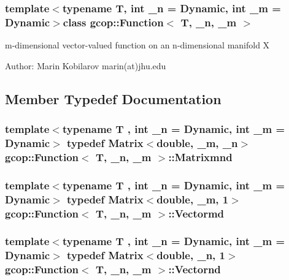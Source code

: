 \subsubsection*{template$<$typename T, int \-\_\-n = \-Dynamic, int \-\_\-m = \-Dynamic$>$class gcop\-::\-Function$<$ T, \-\_\-n, \-\_\-m $>$}

m-\/dimensional vector-\/valued function on an n-\/dimensional manifold \-X

\-Author\-: \-Marin \-Kobilarov marin(at)jhu.\-edu 

\subsection{\-Member \-Typedef \-Documentation}
\subsubsection[{\-Matrixmnd}]{\setlength{\rightskip}{0pt plus 5cm}template$<$typename T , int \-\_\-n = \-Dynamic, int \-\_\-m = \-Dynamic$>$ typedef \-Matrix$<$double, \-\_\-m, \-\_\-n$>$ {\bf gcop\-::\-Function}$<$ \-T, \-\_\-n, \-\_\-m $>$\-::{\bf \-Matrixmnd}}\label{classgcop_1_1Function_ae2d725545d47c845b3a5029243d09256}
\subsubsection[{\-Vectormd}]{\setlength{\rightskip}{0pt plus 5cm}template$<$typename T , int \-\_\-n = \-Dynamic, int \-\_\-m = \-Dynamic$>$ typedef \-Matrix$<$double, \-\_\-m, 1$>$ {\bf gcop\-::\-Function}$<$ \-T, \-\_\-n, \-\_\-m $>$\-::{\bf \-Vectormd}}\label{classgcop_1_1Function_a6a33c3b2a95b0b898bb135f4f35e41c0}
\subsubsection[{\-Vectornd}]{\setlength{\rightskip}{0pt plus 5cm}template$<$typename T , int \-\_\-n = \-Dynamic, int \-\_\-m = \-Dynamic$>$ typedef \-Matrix$<$double, \-\_\-n, 1$>$ {\bf gcop\-::\-Function}$<$ \-T, \-\_\-n, \-\_\-m $>$\-::{\bf \-Vectornd}}\label{classgcop_1_1Function_a56129e22e69e3cf920cac1729b797475}


